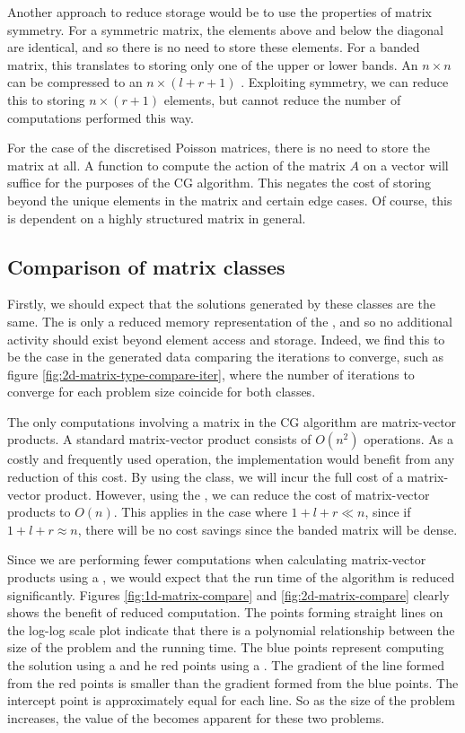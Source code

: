 Another approach to reduce storage would be to use the properties of matrix symmetry. 
For a symmetric matrix, the elements above and below the diagonal are identical, and so there is no need to store these elements.
For a banded matrix, this translates to storing only one of the upper or lower bands.
An $n\times n$  can be compressed to an $n \times (l+r+1)$ .
Exploiting symmetry, we can reduce this to storing $n \times (r+1)$ elements, but cannot reduce the number of computations performed this way.

For the case of the discretised Poisson matrices, there is no need to store the matrix at all.
A function to compute the action of the matrix $A$ on a vector will suffice for the purposes of the CG algorithm. 
This negates the cost of storing beyond the unique elements in the matrix and certain edge cases.
Of course, this is dependent on a highly structured matrix in general.


\subsection{Comparison of matrix classes}

Firstly, we should expect that the solutions generated by these classes are the same.
The  is only a reduced memory representation of the , and so no additional activity should exist beyond element access and storage.
Indeed, we find this to be the case in the generated data comparing the iterations to converge, such as figure \ref{fig:2d-matrix-type-compare-iter}, where the number of iterations to converge for each problem size coincide for both classes.

The only computations involving a matrix in the CG algorithm are matrix-vector products.
A standard matrix-vector product consists of $O(n^2)$ operations.
As a costly and frequently used operation, the implementation would benefit from any reduction of this cost.
By using the  class, we will incur the full cost of a matrix-vector product.
However, using the , we can reduce the cost of matrix-vector products to $O(n)$.
This applies in the case where $1+l+r\ll n$, since if $1+l+r\approx n$, there will be no cost savings since the banded matrix will be dense.

Since we are performing fewer computations when calculating matrix-vector products using a , we would expect that the run time of the algorithm is reduced significantly.
Figures \ref{fig:1d-matrix-compare} and \ref{fig:2d-matrix-compare} clearly shows the benefit of reduced computation.
The points forming straight lines on the log-log scale plot indicate that there is a polynomial relationship between the size of the problem and the running time.
The blue points represent computing the solution using a  and he red points using a .
The gradient of the line formed from the red points is smaller than the gradient formed from the blue points.
The intercept point is approximately equal for each line.
So as the size of the problem increases, the value of the  becomes apparent for these two problems.

